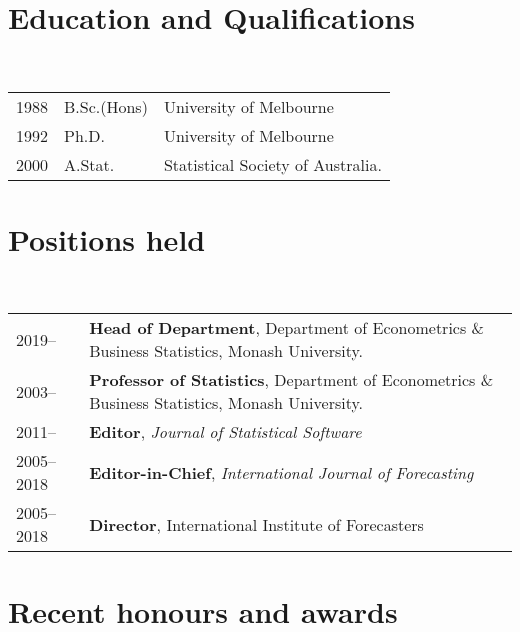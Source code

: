 \documentclass[a4paper,10pt]{article}
\begin{document}
\maketitle

\section{Education and Qualifications}

~\begin{tabular}{lll}
1988 & B.Sc.(Hons) & University of Melbourne\\
1992 & Ph.D. & University of Melbourne\\
2000 & A.Stat. & Statistical Society of Australia.
\end{tabular}


\section{Positions held}

~\begin{tabular}{lP{15cm}}
2019--& \textbf{Head of Department},
        Department of Econometrics \& Business Statistics, Monash University.\\
2003--& \textbf{Professor of Statistics},
        Department of Econometrics \& Business Statistics, Monash University. \\
2011-- & \textbf{Editor}, \textit{Journal of Statistical Software} \\
2005--2018 & \textbf{Editor-in-Chief}, \textit{International Journal of Forecasting} \\
2005--2018 & \textbf{Director}, International Institute of Forecasters \\
  \end{tabular}

\section{Recent honours and awards}
\end{document}
